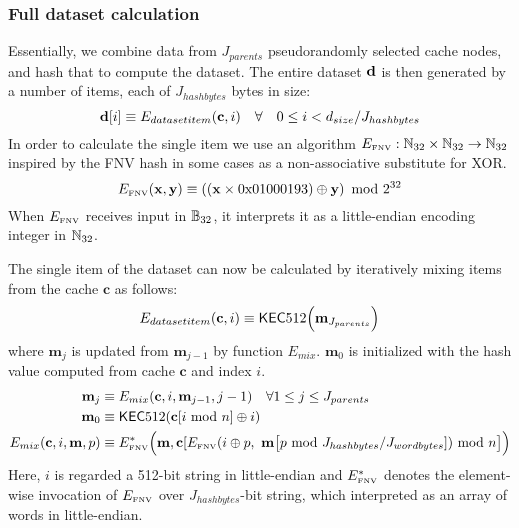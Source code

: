 \subsubsection{Full dataset calculation} \label{app:dataset}
Essentially, we combine data from $J_{parents}$ pseudorandomly selected cache nodes, and hash that to compute the dataset. The entire dataset $\mathbf{d}$ is then generated by a number of items, each of $J_{hashbytes}$ bytes in size:
\begin{equation}
\mathbf{d}[i] \equiv E_{datasetitem}(\mathbf{c}, i) \quad \forall \quad 0\le i < d_{size}/J_{hashbytes} 
\end{equation}
In order to calculate the single item we use an algorithm $E_\text{\tiny FNV}:\mathbb{N}_{32}\times\mathbb{N}_{32} \to \mathbb{N}_{32}$ inspired by the FNV hash \cite{FowlerNollVo1991FNVHash} in some cases as a non-associative substitute for XOR.
\begin{equation}
	E_\text{\tiny FNV}(\mathbf{x}, \mathbf{y}) \equiv \left( (\mathbf{x} \times \mathrm{0x01000193}) \oplus \mathbf{y}\right) \mbox{ mod } 2^{32}
\end{equation}
When $E_\text{\tiny FNV}$ receives input in $\mathbb{B}_{32}$, it interprets it as a little-endian encoding integer in $\mathbb{N}_{32}$.

The single item of the dataset can now be calculated by iteratively mixing items from the cache $\mathbf{c}$ as follows:
\begin{equation}
 E_{datasetitem}(\mathbf{c}, i) \equiv 
 \mathsf{KEC}512\Big(\mathbf{m}_{J_{parents}}\Big)
\end{equation}
where $\mathbf{m}_{j}$ is updated from $\mathbf{m}_{j-1}$ by function $E_{mix}$. $\mathbf{m}_0$ is initialized with the hash value computed from cache $\mathbf{c}$ and index $i$.
\begin{align}
	\mathbf{m}_j &\equiv E_{mix}(\mathbf{c}, i, \mathbf{m}_{j-1},j-1) \quad \forall 1\le j \le J_{parents} \\
	\mathbf{m}_0 &\equiv \mathsf{KEC}512(\mathbf{c}[i\mbox{ mod } n] \oplus i) \\
	E_{mix}(\mathbf{c}, i, \mathbf{m},p) & \equiv E_\text{\tiny FNV}^*\Big(\mathbf{m}, \mathbf{c}[E_\text{\tiny FNV}(i \oplus p, ~ \mathbf{m}\big[p \mbox{ mod } J_{hashbytes} / J_{wordbytes} ]) \mbox{ mod } n \big] \Big)
\end{align}
Here, $i$ is regarded a 512-bit string in little-endian
and $E_\text{\tiny FNV}^*$ denotes the element-wise invocation of $E_\text{\tiny FNV}$ over $J_{hashbytes}$-bit string, which interpreted as an array of words in little-endian. 

